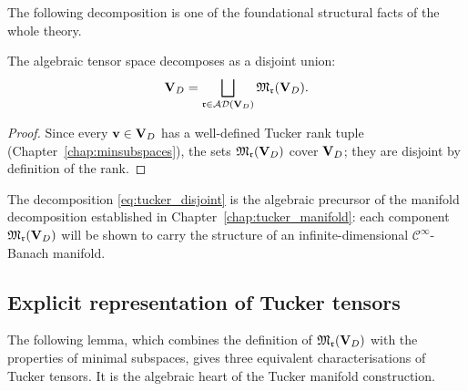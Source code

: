 The following decomposition is one of the foundational structural facts
of the whole theory.

\begin{proposition}
\label{prop:tucker_decomposition}
The algebraic tensor space decomposes as a disjoint union:
\begin{equation}
\label{eq:tucker_disjoint}
    \mathbf{V}_D = \bigsqcup_{\mathfrak{r} \in \mathcal{AD}(\mathbf{V}_D)} \mathfrak{M}_{\mathfrak{r}}(\mathbf{V}_D).
\end{equation}
\end{proposition}

\begin{proof}
Since every $\mathbf{v} \in \mathbf{V}_D$ has a well-defined Tucker rank tuple
(Chapter~\ref{chap:minsubspaces}), the sets $\mathfrak{M}_{\mathfrak{r}}(\mathbf{V}_D)$ cover
$\mathbf{V}_D$; they are disjoint by definition of the rank.
\end{proof}

The decomposition \eqref{eq:tucker_disjoint} is the algebraic precursor
of the manifold decomposition established in
Chapter~\ref{chap:tucker_manifold}: each component $\mathfrak{M}_{\mathfrak{r}}(\mathbf{V}_D)$
will be shown to carry the structure of an infinite-dimensional
$\mathcal{C}^\infty$-Banach manifold.

\subsection*{Explicit representation of Tucker tensors}

The following lemma, which combines the definition of $\mathfrak{M}_{\mathfrak{r}}(\mathbf{V}_D)$
with the properties of minimal subspaces, gives three equivalent
characterisations of Tucker tensors. It is the algebraic heart of the
Tucker manifold construction.

